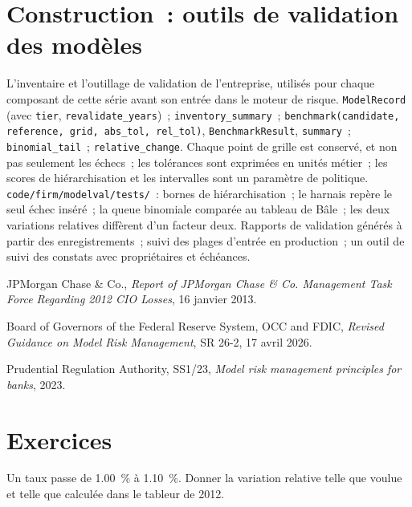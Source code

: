 \section{Construction~: outils de validation des modèles}\label{bld:rc:model-risk-and-validation:modelval}

\begin{build}
 L'inventaire et l'outillage de validation de l'entreprise, utilisés pour chaque composant de cette série
avant son entrée dans le moteur de risque.
 \texttt{ModelRecord} (avec \texttt{tier}, \texttt{revalidate\_years})~;
\texttt{inventory\_summary}~; \texttt{benchmark(candidate, reference, grid, abs\_tol, rel\_tol)},
\texttt{BenchmarkResult}, \texttt{summary}~; \texttt{binomial\_tail}~; \texttt{relative\_change}.
 Chaque point de grille est conservé, et non pas seulement les échecs~; les tolérances sont exprimées en unités métier~; les scores de hiérarchisation et
les intervalles sont un paramètre de politique.
 \texttt{code/firm/modelval/tests/}~: bornes de hiérarchisation~; le harnais repère le
seul échec inséré~; la queue binomiale comparée au tableau de Bâle~; les deux variations relatives diffèrent d'un facteur
deux.
 Rapports de validation générés à partir des enregistrements~; suivi des plages d'entrée en production~;
un outil de suivi des constats avec propriétaires et échéances.
\end{build}

\begin{omsources}
\item JPMorgan Chase \& Co., \emph{Report of JPMorgan Chase \& Co. Management Task Force Regarding 2012
CIO Losses}, 16 janvier 2013.
\item Board of Governors of the Federal Reserve System, OCC and FDIC, \emph{Revised Guidance on Model
Risk Management}, SR 26-2, 17 avril 2026.
\item Prudential Regulation Authority, SS1/23, \emph{Model risk management principles for banks}, 2023.
\end{omsources}

\section{Exercices}

\begin{exercise}[$\star$]\label{exo:rc:model-risk-and-validation:1}
Un taux passe de 1.00~\% à 1.10~\%. Donner la variation relative telle que voulue et telle que calculée dans le
tableur de 2012.
\end{exercise}

